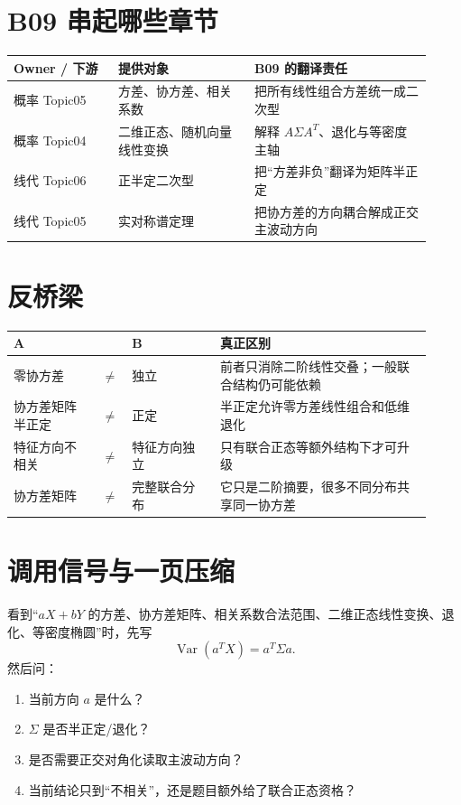 \documentclass[profile=standard]{ipara-handbook}
\begin{document}
\section{B09 串起哪些章节}
\begin{tabular}{p{0.23\linewidth}p{0.30\linewidth}p{0.39\linewidth}}
\hline
Owner / 下游 & 提供对象 & B09 的翻译责任\\
\hline
概率 Topic05 & 方差、协方差、相关系数 & 把所有线性组合方差统一成二次型\\
概率 Topic04 & 二维正态、随机向量线性变换 & 解释 $A\Sigma A^T$、退化与等密度主轴\\
线代 Topic06 & 正半定二次型 & 把“方差非负”翻译为矩阵半正定\\
线代 Topic05 & 实对称谱定理 & 把协方差的方向耦合解成正交主波动方向\\
\hline
\end{tabular}

\section{反桥梁}
\begin{tabular}{p{0.20\linewidth}p{0.04\linewidth}p{0.20\linewidth}p{0.48\linewidth}}
\hline
A & & B & 真正区别\\
\hline
零协方差 & $\neq$ & 独立 & 前者只消除二阶线性交叠；一般联合结构仍可能依赖\\
协方差矩阵半正定 & $\neq$ & 正定 & 半正定允许零方差线性组合和低维退化\\
特征方向不相关 & $\neq$ & 特征方向独立 & 只有联合正态等额外结构下才可升级\\
协方差矩阵 & $\neq$ & 完整联合分布 & 它只是二阶摘要，很多不同分布共享同一协方差\\
\hline
\end{tabular}

\section{调用信号与一页压缩}
看到“$aX+bY$ 的方差、协方差矩阵、相关系数合法范围、二维正态线性变换、退化、等密度椭圆”时，先写
\[
\boxed{\operatorname{Var}(a^TX)=a^T\Sigma a.}
\]
然后问：
\begin{enumerate}
\item 当前方向 $a$ 是什么？
\item $\Sigma$ 是否半正定/退化？
\item 是否需要正交对角化读取主波动方向？
\item 当前结论只到“不相关”，还是题目额外给了联合正态资格？
\end{enumerate}
\end{document}
